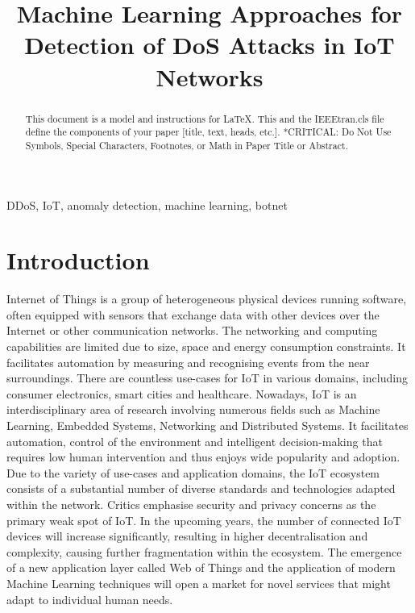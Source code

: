 \documentclass[conference, 11pt]{IEEEtran}
\begin{document}
\title{Machine Learning Approaches for Detection of DoS Attacks in IoT Networks\\}

\author{
}

\maketitle

\begin{abstract}
This document is a model and instructions for \LaTeX.
This and the IEEEtran.cls file define the components of your paper [title, text, heads, etc.]. *CRITICAL: Do Not Use Symbols, Special Characters, Footnotes, 
or Math in Paper Title or Abstract.
\end{abstract}

\begin{IEEEkeywords}
DDoS, IoT, anomaly detection, machine learning, botnet
\end{IEEEkeywords}

\section{Introduction}
Internet of Things is a group of heterogeneous physical devices running software, often equipped with sensors that exchange data with other devices over the Internet or other communication networks.
The networking and computing capabilities are limited due to size, space and energy consumption constraints.
It facilitates automation by measuring and recognising events from the near surroundings.
There are countless use-cases for IoT in various domains, including consumer electronics, smart cities and healthcare.
Nowadays, IoT is an interdisciplinary area of research involving numerous fields such as Machine Learning, Embedded Systems, Networking and Distributed Systems.
It facilitates automation, control of the environment and intelligent decision-making that requires low human intervention and thus enjoys wide popularity and adoption.
Due to the variety of use-cases and application domains, the IoT ecosystem consists of a substantial number of diverse standards and technologies adapted within the network.
Critics emphasise security and privacy concerns as the primary weak spot of IoT.
In the upcoming years, the number of connected IoT devices will increase significantly, resulting in higher decentralisation and complexity, causing further fragmentation within the ecosystem.
The emergence of a new application layer called Web of Things and the application of modern Machine Learning techniques will open a market for novel services that might adapt to individual human needs.
\end{document}
